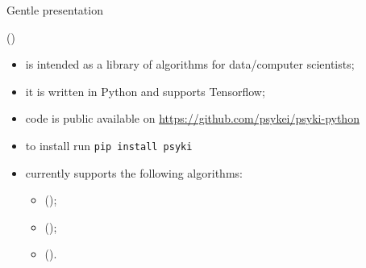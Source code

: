 \documentclass[presentation]{beamer}\mode<presentation>{\usetheme{AMSBolognaFC}}
\begin{document}
\begin{frame}[c]{Gentle presentation}
    \begin{block}{\longpsyki{} (\psyki)}
        \begin{itemize}
            \item \psyki is intended as a library of \ski{} algorithms for data/computer scientists;
            \item it is written in Python and supports Tensorflow;
            \item code is public available on \href{https://github.com/psykei/psyki-python}{https://github.com/psykei/psyki-python}
            \item to install run \texttt{pip install psyki}
            \item currently \psyki{} supports the following \ski{} algorithms:
            \begin{itemize}
                \item \longkins{} (\kins);
                \item \longkill{} (\shortkill);
                \item \longkbann{} (\kbann).
            \end{itemize}
        \end{itemize}
    \end{block}
\end{frame}
\end{document}
